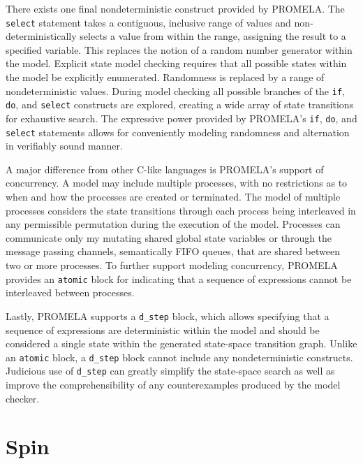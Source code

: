 There exists one final nondeterministic construct provided by PROMELA.
The \texttt{select} statement takes a contiguous, inclusive range of values and non-deterministically selects a value from within the range, assigning the result to a specified variable.
This replaces the notion of a random number generator within the model.
Explicit state model checking requires that all possible states within the model be explicitly enumerated.
Randomness is replaced by a range of nondeterministic values.
During model checking all possible branches of the \texttt{if}, \texttt{do}, and \texttt{select} constructs are explored, creating a wide array of state transitions for exhaustive search.
The expressive power provided by PROMELA's \texttt{if}, \texttt{do}, and \texttt{select} statements allows for conveniently modeling randomness and alternation in verifiably sound manner.

A major difference from other C-like languages is PROMELA's support of concurrency.
A model may include multiple processes, with no restrictions as to when and how the processes are created or terminated.
The model of multiple processes considers the state transitions through each process being interleaved in any permissible permutation during the execution of the model.
Processes can communicate only my mutating shared global state variables or through the message passing channels, semantically FIFO queues, that are shared between two or more processes.
To further support modeling concurrency, PROMELA provides an \texttt{atomic} block for indicating that a sequence of expressions cannot be interleaved between processes.

Lastly, PROMELA supports a \texttt{d\_step} block, which allows specifying that a sequence of expressions are deterministic within the model and should be considered a single state within the generated state-space transition graph.
Unlike an \texttt{atomic} block, a \texttt{d\_step} block cannot include any nondeterministic constructs.
Judicious use of \texttt{d\_step} can greatly simplify the state-space search as well as improve the comprehensibility of any counterexamples produced by the model checker.

\hypertarget{spin}{%
\section{Spin}\label{spin}}

